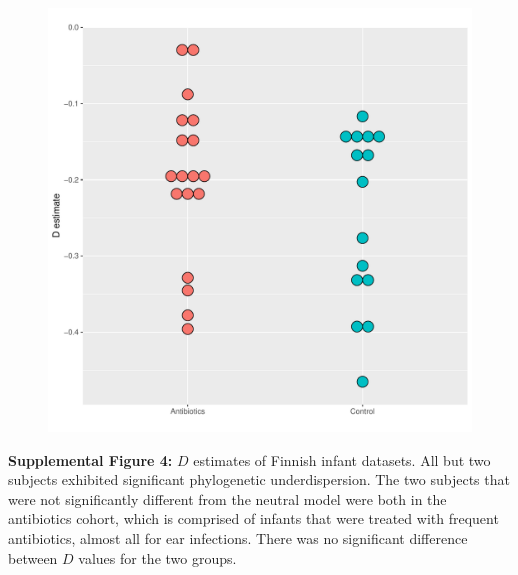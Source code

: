\documentclass{article}
\begin{document}
{\begin{figure}[t]
	\centering
	\includegraphics[scale=0.80]{figs/Fig_S4.pdf}
\end{figure}
\textbf{Supplemental Figure 4:}\label{sec:figureS4} \(D\) estimates of Finnish infant datasets. All but two subjects exhibited significant phylogenetic underdispersion. The two subjects that were not significantly different from the neutral model were both in the antibiotics cohort, which is comprised of infants that were treated with frequent antibiotics, almost all for ear infections. There was no significant difference between \(D\) values for the two groups. 
\newpage

}
\end{document}
